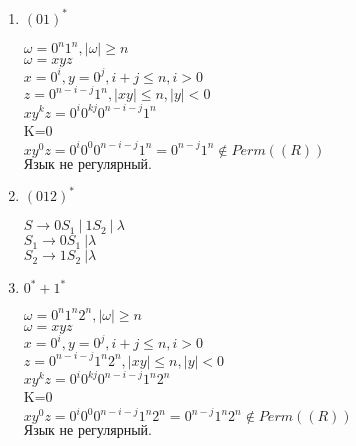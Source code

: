 \documentclass{article}
\begin{document}
    \begin{enumerate}
    
    \item \((01)^*\)
    
    \(\omega = 0^n1^n, |\omega|\geq n\)\\
	\(\omega = xyz\)\\
	\(x = 0^i, y=0^j, i+j\leq n, i>0\)\\
	\(z = 0^{n-i-j}1^n , |xy|\leq n, |y|<0\)\\
	\(xy^kz=0^i0^{kj}0^{n-i-j}1^n\)\\
	K=0\\
	\(xy^0z=0^i0^{0}0^{n-i-j}1^n=0^{n-j}1^n \notin Perm((R))\)\\ 
	\(\text{Язык не регулярный.}\)\\
		 
    \item \((012)^*\)
    
    \begin{center}
    \end{center}
    
    \(S\rightarrow 0S_1\ | \ 1S_2 \ | \ \lambda \)\\
	\(S_1\rightarrow 0S_1\ | \lambda\)\\
	\(S_2\rightarrow 1S_2\ | \lambda\)\\
	
    \item \(0^*+1^*\)
    
    \(\omega = 0^n1^n2^n, |\omega|\geq n\)\\
	\(\omega = xyz\)\\
	\(x = 0^i, y=0^j, i+j\leq n, i>0\)\\
	\(z = 0^{n-i-j}1^n2^n , |xy|\leq n, |y|<0\)\\
	\(xy^kz=0^i0^{kj}0^{n-i-j}1^n2^n\)\\
	K=0\\
	\(xy^0z=0^i0^{0}0^{n-i-j}1^n2^n=0^{n-j}1^n2^n \notin Perm((R))\)\\ 
	\(\text{Язык не регулярный.}\)\\
	
    \end{enumerate}
    
\end{document}
